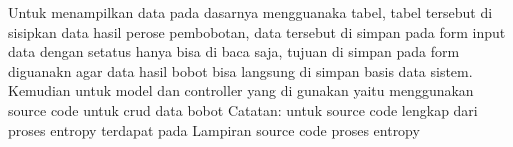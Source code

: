 Untuk menampilkan data pada dasarnya mengguanaka tabel, tabel tersebut di sisipkan data hasil perose pembobotan, data tersebut di simpan pada form input data dengan setatus hanya bisa di baca saja, tujuan di simpan pada form diguanakn agar data hasil bobot bisa langsung di simpan basis data sistem. Kemudian untuk model dan controller yang di gunakan yaitu menggunakan source code untuk crud data bobot 
	Catatan: untuk source code lengkap dari proses entropy terdapat pada Lampiran source code proses entropy



